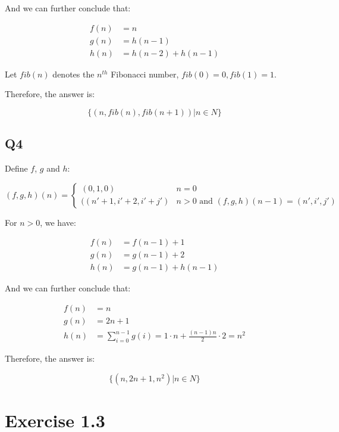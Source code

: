 \documentclass[11pt,a4paper]{article}
\begin{document}
And we can further conclude that:

\begin{align*}
    f(n) & = n \\
    g(n) & = h(n-1) \\
    h(n) & = h(n-2) + h(n-1)
\end{align*}

Let $fib(n)$ denotes the $n^{th}$ Fibonacci number, $fib(0) = 0, fib(1) = 1$.

Therefore, the answer is:

\begin{equation*}
    \{ (n,fib(n),fib(n+1)) | n \in N \}
\end{equation*}

\subsection{Q4}

Define $f$, $g$ and $h$:

\begin{equation*}
    (f, g, h)(n) =
    \begin{cases}
        (0,1,0) & n = 0 \\
        ((n'+1, i'+2, i'+j') & n > 0 \text{ and }
            (f,g,h)(n-1) = (n',i',j')
    \end{cases}
\end{equation*}

For $n > 0$, we have:

\begin{align*}
    f(n) & = f(n-1) + 1 \\
    g(n) & = g(n-1) + 2 \\
    h(n) & = g(n-1) + h(n-1)
\end{align*}

And we can further conclude that:

\begin{align*}
    f(n) & = n \\
    g(n) & = 2n+1 \\
    h(n) & = \sum_{i=0}^{n-1} g(i) = 1 \cdot n + \frac{(n-1)n}{2} \cdot 2 = n^2
\end{align*}

Therefore, the answer is:

\begin{equation*}
    \{ (n,2n+1,n^2) | n \in N \}
\end{equation*}

\section{Exercise 1.3}
\end{document}
